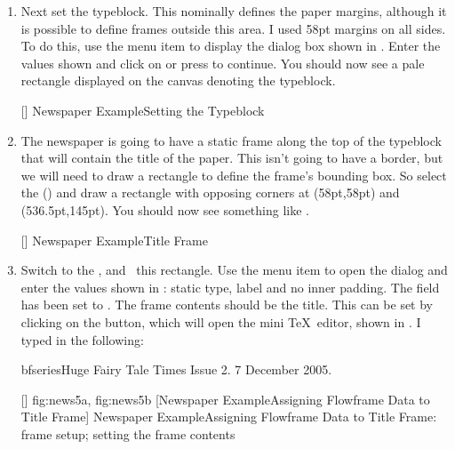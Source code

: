 \begin{enumerate}
\item Next set the \gls{typeblock}. This nominally defines the paper
margins, although it is possible to define frames outside this
area. I used 58\gls{pt} margins on all sides. To do this, use the
 menu item to display
the  dialog box shown in . Enter the values
shown and click on  or press 
to continue. You should now see a pale  rectangle displayed
on the \gls{canvas} denoting the \gls{typeblock}.

[]
{}
{Newspaper Example\dash Setting the Typeblock}

\item The newspaper is going to have a static frame along the
top of the \gls{typeblock} that will contain the title of the paper. This
isn't going to have a border, but we will need to draw a rectangle
to define the frame's bounding box. So select the
 () and draw a
rectangle with opposing corners at (58pt,58pt) and
(536.5pt,145pt). You should now see something like
.

[]
{}
{Newspaper Example\dash Title Frame}

\item Switch to the , and
\select\ this rectangle. Use the  menu item
to open the  dialog and enter the values
shown in : static type, label  and
no inner padding. The  field has been set to
.
The frame contents should be the title.
This can be set by clicking on the 
button, which will open the mini \TeX\ editor, shown in
.
I typed in the following:
\begin{compactcodebox*}
\gls{bfseries}\gls{Huge}
Fairy Tale Times
 Issue 2. 7 December 2005.
\end{compactcodebox*}

[]
{
 {fig:news5a}{}{},
 {fig:news5b}{}{}
}
[Newspaper Example\dash Assigning Flowframe Data to Title Frame]
{Newspaper Example\dash Assigning Flowframe Data to Title
Frame:
 frame setup;
 setting the frame contents}


\end{enumerate}
